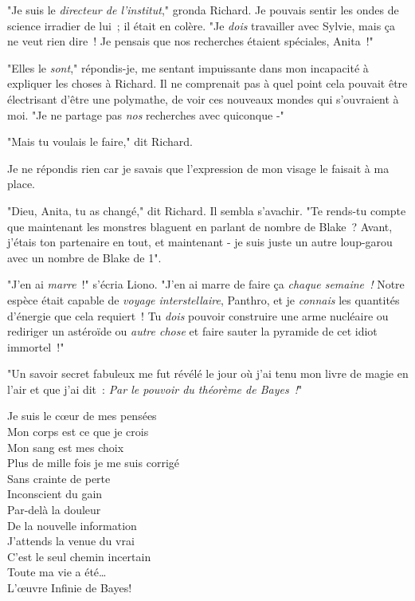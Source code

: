 "Je suis le \emph{directeur de l'institut}," gronda Richard. Je pouvais sentir les ondes de science irradier de lui~; il était en colère. "Je \emph{dois} travailler avec Sylvie, mais ça ne veut rien dire~! Je pensais que nos recherches étaient spéciales, Anita~!"

"Elles le \emph{sont}," répondis-je, me sentant impuissante dans mon incapacité à expliquer les choses à Richard. Il ne comprenait pas à quel point cela pouvait être électrisant d'être une polymathe, de voir ces nouveaux mondes qui s'ouvraient à moi. "Je ne partage pas \emph{nos} recherches avec quiconque -"

"Mais tu voulais le faire," dit Richard.

Je ne répondis rien car je savais que l'expression de mon visage le faisait à ma place.

"Dieu, Anita, tu as changé," dit Richard. Il sembla s'avachir. "Te rends-tu compte que maintenant les monstres blaguent en parlant de nombre de Blake~? Avant, j'étais ton partenaire en tout, et maintenant - je suis juste un autre loup-garou avec un nombre de Blake de 1".


"J'en ai \emph{marre}~!" s'écria Liono. "J'en ai marre de faire ça \emph{chaque semaine~!} Notre espèce était capable de \emph{voyage interstellaire}, Panthro, et je \emph{connais} les quantités d'énergie que cela requiert~! Tu \emph{dois} pouvoir construire une arme nucléaire ou rediriger un astéroïde ou \emph{autre chose} et faire sauter la pyramide de cet idiot immortel~!"

\clearpage
{}

"Un savoir secret fabuleux me fut révélé le jour où j'ai tenu mon livre de magie en l'air et que j'ai dit~: \emph{Par le pouvoir du théorème de Bayes~!}"


\begin{emph}
Je suis le cœur de mes pensées\\
Mon corps est ce que je crois\\
Mon sang est mes choix\\
Plus de mille fois je me suis corrigé\\
Sans crainte de perte\\
Inconscient du gain\\
Par-delà la douleur\\
De la nouvelle information\\
J'attends la venue du vrai\\
C'est le seul chemin incertain\\
Toute ma vie a été…\\
L'œuvre Infinie de Bayes!
\end{emph}

